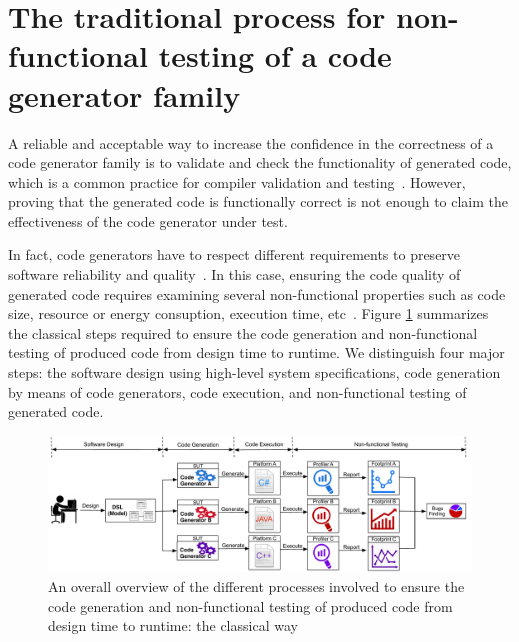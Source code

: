 \section{The traditional process for non-functional testing of a code generator family}
A reliable and acceptable way to increase the confidence in the correctness of a code generator family is to validate and check the functionality of generated code, which is a common practice for compiler validation and testing~\cite{jorges2014back,stuermer2007systematic,sturmer2005overview}.
However, proving that the generated code is functionally correct is not enough to claim the effectiveness of the code generator under test. 

In fact, code generators have to respect different requirements to preserve software reliability and quality~\cite{demertzi2011analyzing}. 
In this case, ensuring the code quality of generated code requires examining several non-functional properties such as code size, resource or energy consuption, execution time, etc~\cite{pan2006fast}.
Figure \ref{fig:bbackground.pdf} summarizes the classical steps required to ensure the code generation and non-functional testing of produced code from design time to runtime. 
We distinguish four major steps: the software design using high-level system specifications, code generation by means of code generators, code execution, and non-functional testing of generated code. 


\begin{figure}[t]
	\center
	
	\includegraphics[width=1.\linewidth]{chapitre4/fig/background.pdf}
	\caption{An overall overview of the different processes involved to ensure the code generation and non-functional testing of produced code from design time to runtime: the classical way}
	\label{fig:bbackground.pdf}
\end{figure}


